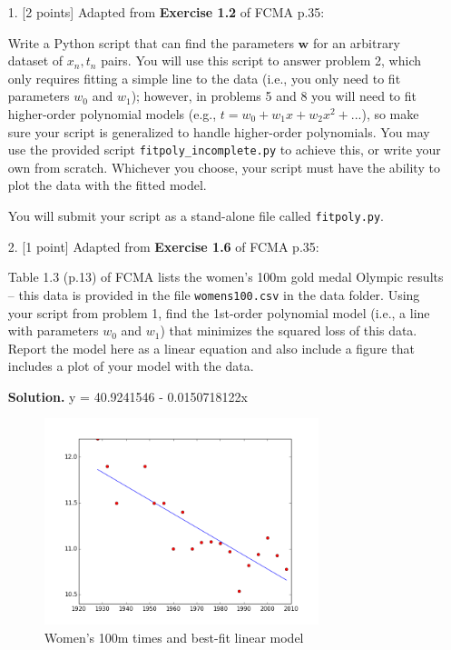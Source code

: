 \documentclass[10pt]{article}
\begin{document}

\newpage
\begin{itemize}

\item[1.] [2 points]
Adapted from {\bf Exercise 1.2} of FCMA p.35:

Write a Python script that can find the parameters $\mathbf{w}$ for an arbitrary dataset of $x_n, t_n$ pairs.  You will use this script to answer problem 2, which only requires fitting a simple line to the data (i.e., you only need to fit parameters $w_0$ and $w_1$); however, in problems 5 and 8 you will need to fit higher-order polynomial models (e.g., $t = w_0 + w_1x + w_2x^2 + ...$), so make sure your script is generalized to handle higher-order polynomials.  You may use the provided script {\tt fitpoly\_incomplete.py} to achieve this, or write your own from scratch.  Whichever you choose, your script must have the ability to plot the data with the fitted model.

You will submit your script as a stand-alone file called {\tt fitpoly.py}.


\item[2.] [1 point]
Adapted from {\bf Exercise 1.6} of FCMA p.35:

Table 1.3 (p.13) of FCMA lists the women's 100m gold medal Olympic results -- this data is provided in the file {\tt womens100.csv} in the data folder.  Using your script from problem 1, find the 1st-order polynomial model (i.e., a line with parameters $w_0$ and $w_1$) that minimizes the squared loss of this data.  Report the model here as a linear equation and also include a figure that includes a plot of your model with the data.

{\bf Solution.}  y = 40.9241546 - 0.0150718122x

\begin{figure}[htb]
\begin{center}
\includegraphics[width=8cm]{womens100.png}
\caption{Women's 100m times and best-fit linear model\label{fig:womens100}}
\end{center}
\end{figure}



\end{itemize}
\end{document}
